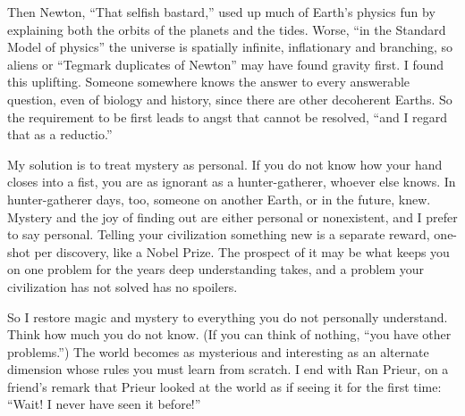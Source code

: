 Then Newton, ``That selfish bastard,'' used up much of Earth's physics fun by explaining both the orbits of the planets and the tides. Worse, ``in the Standard Model of physics'' the universe is spatially infinite, inflationary and branching, so aliens or ``Tegmark duplicates of Newton'' may have found gravity first.  I found this uplifting. Someone somewhere knows the answer to every answerable question, even of biology and history, since there are other decoherent Earths. So the requirement to be first leads to angst that cannot be resolved, ``and I regard that as a reductio.'' 

My solution is to treat mystery as personal. If you do not know how your hand closes into a fist, you are as ignorant as a hunter-gatherer, whoever else knows. In hunter-gatherer days, too, someone on another Earth, or in the future, knew. Mystery and the joy of finding out are either personal or nonexistent, and I prefer to say personal. Telling your civilization something new is a separate reward, one-shot per discovery, like a Nobel Prize. The prospect of it may be what keeps you on one problem for the years deep understanding takes, and a problem your civilization has not solved has no spoilers.

So I restore magic and mystery to everything you do not personally understand. Think how much you do not know. (If you can think of nothing, ``you have other problems.'') The world becomes as mysterious and interesting as an alternate dimension whose rules you must learn from scratch. I end with Ran Prieur, on a friend's remark that Prieur looked at the world as if seeing it for the first time: ``Wait! I never have seen it before!''
